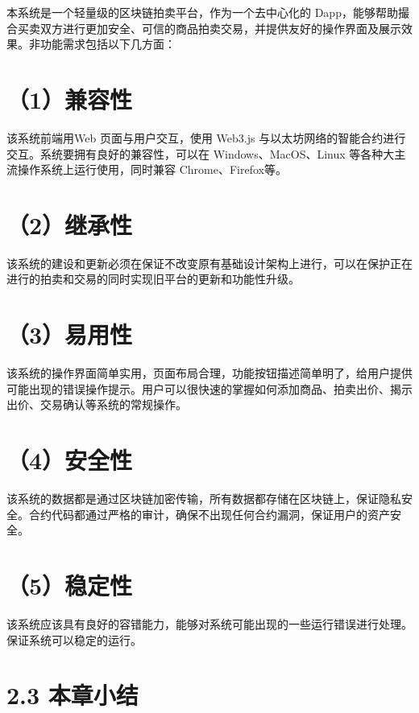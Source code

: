 \documentclass[
  10
]{article}
\begin{document}
本系统是一个轻量级的区块链拍卖平台，作为一个去中心化的
Dapp，能够帮助撮合买卖双方进行更加安全、可信的商品拍卖交易，并提供友好的操作界面及展示效果。非功能需求包括以下几方面：

\section{（1）兼容性}\label{ux517cux5bb9ux6027}

该系统前端用Web 页面与用户交互，使用 Web3.js
与以太坊网络的智能合约进行交互。系统要拥有良好的兼容性，可以在
Windows、MacOS、Linux 等各种大主流操作系统上运行使用，同时兼容
Chrome、Firefox等。

\section{（2）继承性}\label{ux7ee7ux627fux6027}

该系统的建设和更新必须在保证不改变原有基础设计架构上进行，可以在保护正在进行的拍卖和交易的同时实现旧平台的更新和功能性升级。

\section{（3）易用性}\label{ux6613ux7528ux6027}

该系统的操作界面简单实用，页面布局合理，功能按钮描述简单明了，给用户提供可能出现的错误操作提示。用户可以很快速的掌握如何添加商品、拍卖出价、揭示出价、交易确认等系统的常规操作。

\section{（4）安全性}\label{ux5b89ux5168ux6027}

该系统的数据都是通过区块链加密传输，所有数据都存储在区块链上，保证隐私安全。合约代码都通过严格的审计，确保不出现任何合约漏洞，保证用户的资产安全。

\section{（5）稳定性}\label{ux7a33ux5b9aux6027}

该系统应该具有良好的容错能力，能够对系统可能出现的一些运行错误进行处理。保证系统可以稳定的运行。

\section{2.3 本章小结}\label{ux672cux7ae0ux5c0fux7ed3-1}
\end{document}
